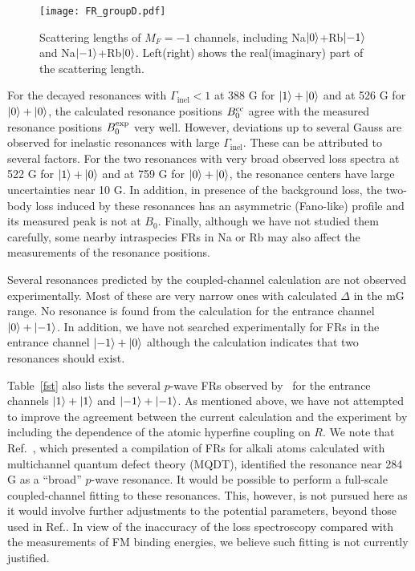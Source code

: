 \begin{figure}[htb]
\begin{center}
\texttt{[image: FR\_groupD.pdf]}
\end{center}
\caption[Scattering lengths of $M_F=-1$ channels]{Scattering lengths of $M_F=-1$ channels, including Na$\ket{0}$+Rb$\ket{-1}$ and Na$\ket{-1}$+Rb$\ket{0}$. Left(right) shows the real(imaginary) part of the scattering length.}
\label{FR_groupD}
\end{figure}

For the decayed resonances with $\Gamma_\textrm{inel} <1$ at 388 G for $\ket{1}+\ket{0}$ and at 526 G for $\ket{0}+\ket{0}$, the calculated resonance positions $B_0^{\rm cc}$ agree with the measured resonance positions $B_0^{\rm exp}$ very well. However, deviations up to several Gauss are observed for inelastic resonances with large $\Gamma_\textrm{inel}$. These can be attributed to several factors. For the two resonances with very broad observed loss spectra at 522 G for $\ket{1}+\ket{0}$ and at 759 G for $\ket{0}+\ket{0}$, the resonance centers have large uncertainties near 10 G. In addition, in presence of the background loss, the two-body loss induced by these resonances has an asymmetric (Fano-like) profile and its measured peak is not at $B_0$. Finally, although we have not studied them carefully, some nearby intraspecies FRs in Na or Rb may also affect the measurements of the resonance positions.

Several resonances predicted by the coupled-channel calculation are not observed experimentally. Most of these are very narrow ones with calculated $\Delta$ in the mG range. No resonance is found from the calculation for the entrance channel $\ket{0}+\ket{-1}$. In addition, we have not searched experimentally for FRs in the entrance channel $\ket{-1}+\ket{0}$ although the calculation indicates that two resonances should exist.

Table~\ref{fst} also lists the several $p$-wave FRs observed by~\cite{wang2013observation} for the entrance channels $\ket{1}+\ket{1}$ and $\ket{-1}+\ket{-1}$. As mentioned above, we have not attempted to improve the agreement between the current calculation and the experiment by including the dependence of the atomic hyperfine coupling on $R$. We note that Ref.~\cite{Cui2018}, which presented a compilation of FRs for alkali atoms calculated with multichannel quantum defect theory (MQDT), identified the resonance near 284 G as a ``broad'' $p$-wave resonance. It would be possible to perform a full-scale coupled-channel fitting to these resonances. This, however, is not pursued here as it would involve further adjustments to the potential parameters, beyond those used in Ref.\cite{guo2021leehuangyang}. In view of the inaccuracy of the loss spectroscopy compared with the measurements of FM binding energies, we believe such fitting is not currently justified.

